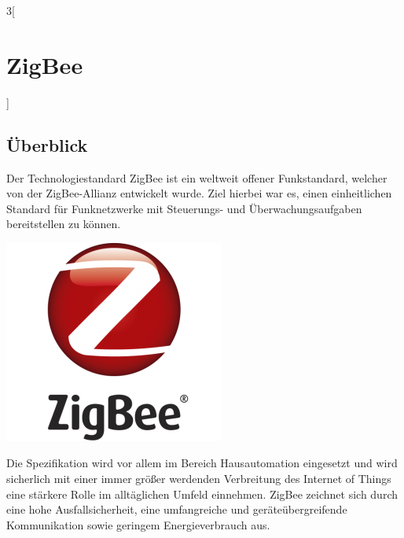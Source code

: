 \begin{multicols}{3}[\section{ZigBee}]
\subsection*{Überblick}
Der Technologiestandard ZigBee ist ein weltweit offener Funkstandard, welcher von der ZigBee-Allianz entwickelt wurde. Ziel hierbei war es, einen einheitlichen Standard für Funknetzwerke mit Steuerungs- und Überwachungsaufgaben bereitstellen zu können.~\cite{zigbee.1} 
\begin{Figure}
\includegraphics[width=\linewidth]{Kapitel/ZigBee/Grafiken/zigbee_logo.png}
\label{fig:vorlage.zemath}
\end{Figure}
Die Spezifikation wird vor allem im Bereich Hausautomation eingesetzt und wird sicherlich mit einer immer größer werdenden Verbreitung des Internet of Things eine stärkere Rolle im alltäglichen Umfeld einnehmen. 
ZigBee zeichnet sich durch eine hohe Ausfallsicherheit, eine umfangreiche und geräteübergreifende Kommunikation sowie geringem Energieverbrauch aus.~\cite{zigbee.2}


\end{multicols}
